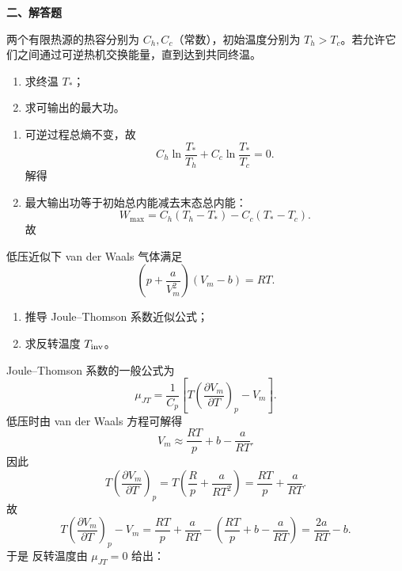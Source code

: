 \textbf{二、解答题}
\begin{question}
两个有限热源的热容分别为 $C_h,C_c$（常数），初始温度分别为 $T_h>T_c$。若允许它们之间通过可逆热机交换能量，直到达到共同终温。
\begin{enumerate}[label=（\arabic*）,leftmargin=2.8em,itemsep=0.2em]
\item 求终温 $T_*$；
\item 求可输出的最大功。
\end{enumerate}
\begin{solution}

\begin{enumerate}[label=（\arabic*）,leftmargin=2.8em,itemsep=0.2em]
\item 可逆过程总熵不变，故
\[
C_h\ln\frac{T_*}{T_h}+C_c\ln\frac{T_*}{T_c}=0.
\]
解得

\item 最大输出功等于初始总内能减去末态总内能：
\[
W_{\max}=C_h(T_h-T_*)-C_c(T_*-T_c).
\]
故
\end{enumerate}
\end{solution}
\end{question}

\begin{question}
低压近似下 van der Waals 气体满足
\[
\left(p+\frac{a}{V_m^2}\right)(V_m-b)=RT.
\]
\begin{enumerate}[label=（\arabic*）,leftmargin=2.8em,itemsep=0.2em]
\item 推导 Joule--Thomson 系数近似公式；
\item 求反转温度 $T_{\rm inv}$。
\end{enumerate}
\begin{solution}

Joule--Thomson 系数的一般公式为
\[
\mu_{JT}=\frac{1}{C_p}\left[T\left(\frac{\partial V_m}{\partial T}\right)_p-V_m\right].
\]
低压时由 van der Waals 方程可解得
\[
V_m\approx \frac{RT}{p}+b-\frac{a}{RT}.
\]
因此
\[
T\left(\frac{\partial V_m}{\partial T}\right)_p
=T\left(\frac{R}{p}+\frac{a}{RT^2}\right)
=\frac{RT}{p}+\frac{a}{RT}.
\]
故
\[
T\left(\frac{\partial V_m}{\partial T}\right)_p-V_m
=\frac{RT}{p}+\frac{a}{RT}-\left(\frac{RT}{p}+b-\frac{a}{RT}\right)
=\frac{2a}{RT}-b.
\]
于是
反转温度由 $\mu_{JT}=0$ 给出：
\end{solution}
\end{question}


